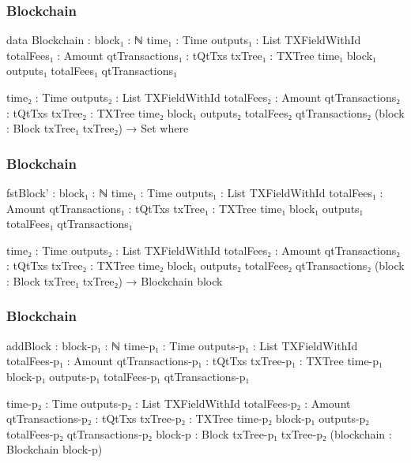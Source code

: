 \documentclass{beamer}
\begin{document}
\begin{frame}
  \frametitle{Blockchain}
\begin{code}

      data Blockchain :
        {block₁ : ℕ}
        {time₁ : Time}
        {outputs₁ : List TXFieldWithId}
        {totalFees₁ : Amount}
        {qtTransactions₁ : tQtTxs}
        {txTree₁ : TXTree time₁ block₁ outputs₁
          totalFees₁ qtTransactions₁}

        {time₂ : Time}
        {outputs₂ : List TXFieldWithId}
        {totalFees₂ : Amount}
        {qtTransactions₂ : tQtTxs}
        {txTree₂ : TXTree time₂ block₁ outputs₂ totalFees₂
          qtTransactions₂}
        (block : Block txTree₁ txTree₂)
        → Set where

\end{code}
\end{frame}
\begin{frame}
  \frametitle{Blockchain}
\begin{code}

          fstBlock' :
            {block₁ : ℕ}
            {time₁ : Time}
            {outputs₁ : List TXFieldWithId}
            {totalFees₁ : Amount}
            {qtTransactions₁ : tQtTxs}
            {txTree₁ : TXTree time₁ block₁ outputs₁ totalFees₁
              qtTransactions₁}

            {time₂ : Time}
            {outputs₂ : List TXFieldWithId}
            {totalFees₂ : Amount}
            {qtTransactions₂ : tQtTxs}
            {txTree₂ : TXTree time₂ block₁ outputs₂ totalFees₂
              qtTransactions₂}
            (block : Block txTree₁ txTree₂)
            → Blockchain block

\end{code}
\end{frame}
\begin{frame}
  \frametitle{Blockchain}
\begin{code}

          addBlock :
            {block-p₁ : ℕ}
            {time-p₁ : Time}
            {outputs-p₁ : List TXFieldWithId}
            {totalFees-p₁ : Amount}
            {qtTransactions-p₁ : tQtTxs}
            {txTree-p₁ : TXTree time-p₁ block-p₁
              outputs-p₁ totalFees-p₁ qtTransactions-p₁}

            {time-p₂ : Time}
            {outputs-p₂ : List TXFieldWithId}
            {totalFees-p₂ : Amount}
            {qtTransactions-p₂ : tQtTxs}
            {txTree-p₂ : TXTree time-p₂ block-p₁
              outputs-p₂ totalFees-p₂ qtTransactions-p₂}
            {block-p : Block txTree-p₁ txTree-p₂}
            (blockchain : Blockchain block-p)

\end{code}
\end{frame}
\end{document}

